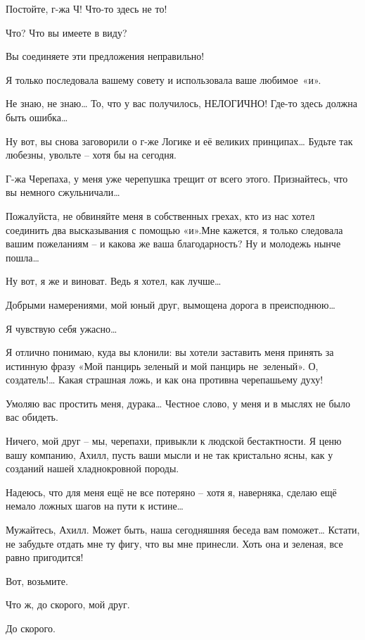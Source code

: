 \documentclass[../main.tex]{subfiles}
\begin{document}
\begin{Dialogue}

 Постойте, г-жа Ч! Что-то здесь не то!

 Что? Что вы имеете в виду?

 Вы соединяете эти предложения неправильно!

 Я только последовала вашему совету и использовала ваше любимое~«и».

 Не знаю, не знаю\ldots{} То, что у вас получилось, НЕЛОГИЧНО! Где-то здесь должна быть ошибка\ldots{}

 Ну вот, вы снова заговорили о г-же Логике и её великих принципах\ldots{} Будьте так любезны, увольте \--- хотя бы на сегодня.

 Г-жа Черепаха, у меня уже черепушка трещит от всего этого. Признайтесь, что вы немного сжульничали\ldots{}

 Пожалуйста, не обвиняйте меня в собственных грехах, кто из нас хотел соединить два высказывания с помощью «и».Мне кажется, я только следовала вашим пожеланиям \--- и какова же ваша благодарность? Ну и молодежь нынче пошла\ldots{}

 Ну вот, я же и виноват. Ведь я хотел, как лучше\ldots{}

 Добрыми намерениями, мой юный друг, вымощена дорога в преисподнюю\ldots{}

 Я чувствую себя ужасно\ldots{}

 Я отлично понимаю, куда вы клонили: вы хотели заставить меня принять за истинную фразу «Мой панцирь зеленый и мой панцирь не~зеленый». О, создатель!\ldots{} Какая страшная ложь, и как она противна черепашьему духу!

 Умоляю вас простить меня, дурака\ldots{} Честное слово, у меня и в мыслях не было вас обидеть.

 Ничего, мой друг \--- мы, черепахи, привыкли к людской бестактности. Я ценю вашу компанию, Ахилл, пусть ваши мысли и не так кристально ясны, как у созданий нашей хладнокровной породы.

 Надеюсь, что для меня ещё не все потеряно \--- хотя я, наверняка, сделаю ещё немало ложных шагов на пути к истине\ldots{}

 Мужайтесь, Ахилл. Может быть, наша сегодняшняя беседа вам поможет\ldots{} Кстати, не забудьте отдать мне ту фигу, что вы мне принесли. Хоть она и зеленая, все равно пригодится!

 Вот, возьмите.

 Что ж, до скорого, мой друг.

 До скорого.

\end{Dialogue}
\end{document}
